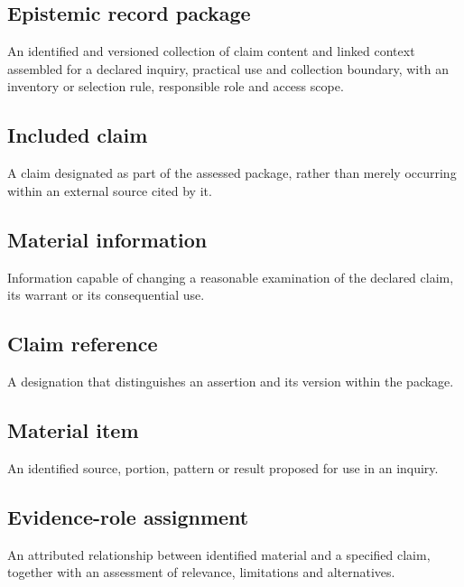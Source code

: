 \documentclass[11pt,a4paper]{article}
\begin{document}
\subsection{Epistemic record package}
An identified and versioned collection of claim content and linked context assembled for a declared inquiry, practical use and collection boundary, with an inventory or selection rule, responsible role and access scope.

\subsection{Included claim}
A claim designated as part of the assessed package, rather than merely occurring within an external source cited by it.

\subsection{Material information}
Information capable of changing a reasonable examination of the declared claim, its warrant or its consequential use.

\subsection{Claim reference}
A designation that distinguishes an assertion and its version within the package.

\subsection{Material item}
An identified source, portion, pattern or result proposed for use in an inquiry.

\subsection{Evidence-role assignment}
An attributed relationship between identified material and a specified claim, together with an assessment of relevance, limitations and alternatives.
\end{document}
